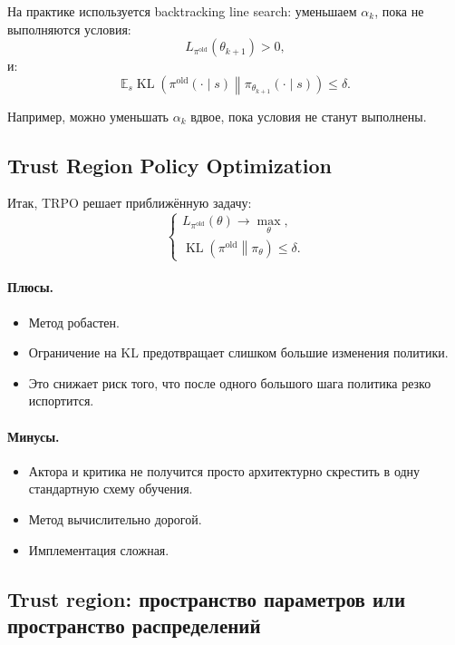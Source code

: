 \documentclass[12pt,a4paper]{article}
\begin{document}
На практике используется backtracking line search: уменьшаем $\alpha_k$, пока не выполняются условия:
\[
L_{\pi^{\mathrm{old}}}(\theta_{k+1})>0,
\]
и:
\[
\mathbb E_s
\operatorname{KL}
\left(
\pi^{\mathrm{old}}(\cdot\mid s)
\middle\|
\pi_{\theta_{k+1}}(\cdot\mid s)
\right)
\le
\delta.
\]

Например, можно уменьшать $\alpha_k$ вдвое, пока условия не станут выполнены.

\subsection{Trust Region Policy Optimization}

Итак, TRPO решает приближённую задачу:
\[
\begin{cases}
L_{\pi^{\mathrm{old}}}(\theta)
\to
\max\limits_\theta,
\\[0.4em]
\operatorname{KL}
\left(
\pi^{\mathrm{old}}
\middle\|
\pi_\theta
\right)
\le
\delta.
\end{cases}
\]

\paragraph{Плюсы.}

\begin{itemize}
    \item Метод робастен.
    \item Ограничение на KL предотвращает слишком большие изменения политики.
    \item Это снижает риск того, что после одного большого шага политика резко испортится.
\end{itemize}

\paragraph{Минусы.}

\begin{itemize}
    \item Актора и критика не получится просто архитектурно скрестить в одну стандартную схему обучения.
    \item Метод вычислительно дорогой.
    \item Имплементация сложная.
\end{itemize}

\subsection{Trust region: пространство параметров или пространство распределений}
\end{document}
